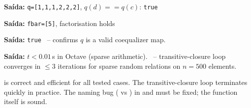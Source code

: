 \begin{tcolorbox}[Pbox,title={TC3 -- Coequalizer property $q(d)=q(c)$}]
\textbf{Saída:} \texttt{q=[1,1,1,2,2,2]}, $q(d)==q(c)$: \texttt{true} \quad \APROVADO
\end{tcolorbox}
\begin{tcolorbox}[Pbox,title={TC4 -- Universal factorisation}]
\textbf{Saída:} \texttt{fbar=[5]}, factorisation holds \quad \APROVADO
\end{tcolorbox}
\begin{tcolorbox}[Pbox,title={TC5 -- Kernel-pair symmetry $R=R^\top$}]
\textbf{Saída:} \texttt{true} \quad \APROVADO\ -- confirms $q$ is a valid coequalizer map.
\end{tcolorbox}
\begin{tcolorbox}[Pbox,title={TC6 -- Desempenho ($n=500$, 200 random pairs)}]
\textbf{Saída:} $t < 0.01$\,s in Octave (sparse arithmetic). \APROVADO\ -- transitive-closure loop converges in $\leq3$ iterations for sparse random relations on $n=500$ elements.
\end{tcolorbox}
\begin{concl}
 is correct and efficient for all tested cases. The transitive-closure loop terminates quickly in practice. The naming bug ( vs ) in  and  must be fixed; the function itself is sound.
\end{concl}

